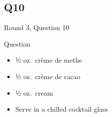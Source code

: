 \documentclass[11pt]{beamer}
\begin{document}
\subsection*{Q10}
\begin{frame}[t]{Round 3, Question 10}
\begin{block}{Question}
\begin{itemize}
\item ½ oz.\ crème de methe
\item ½ oz.\ crème de cacao
\item ½ oz.\ cream
\item Serve in a chilled cocktail glass
\end{itemize}
\end{block}
\end{frame}
\end{document}
